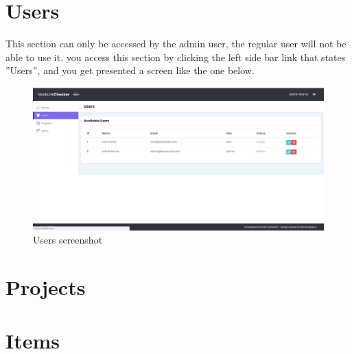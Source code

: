 \section{Users}
This section can only be accessed by the admin user, the regular user will not be able to use it. you access this section by clicking the left side bar link that states ''Users'', and you get presented a screen like the one below.
\begin{figure}[ht!]
	\caption{Users screenshot}
	\label{img:login}
	\includegraphics[width=\textwidth]{images/users_screenshot}
\end{figure}

\section{Projects}

\section{Items}
